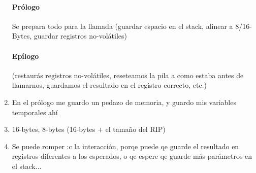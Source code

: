 \begin{enumerate}
  \paragraph{Prólogo} Se prepara todo para la llamada (guardar espacio en el stack, alinear a 8/16-Bytes, guardar registros no-volátiles)
  \paragraph{Epílogo} (restaurás registros no-volátiles, reseteamos la pila a como estaba antes de llamarnos, guardamos el resultado en el registro correcto, etc.)

\item En el prólogo me guardo un pedazo de memoria, y guardo mis variables temporales ahí

\item 16-bytes, 8-bytes (16-bytes + el tamaño del RIP)

\item Se puede romper :c la interacción, porqe puede qe guarde el resultado en registros diferentes a los esperados, o qe espere qe guarde más parámetros en el stack...
\end{enumerate}


